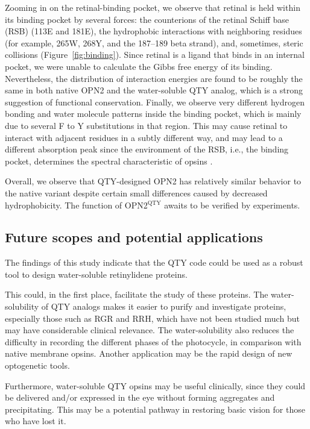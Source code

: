 \documentclass[fleqn, 10pt, lineno]{manuscript}
\begin{document}
Zooming in on the retinal-binding pocket, we observe that retinal is held within its binding pocket by several forces: the counterions of the retinal Schiff base (RSB) (113E and 181E), the hydrophobic interactions with neighboring residues (for example, 265W, 268Y, and the 187--189 beta strand), and, sometimes, steric collisions (Figure~\ref{fig:binding}). Since retinal is a ligand that binds in an internal pocket, we were unable to calculate the Gibbs free energy of its binding. Nevertheless, the distribution of interaction energies are found to be roughly the same in both native OPN2 and the water-soluble QTY analog, which is a strong suggestion of functional conservation. Finally, we observe very different hydrogen bonding and water molecule patterns inside the binding pocket, which is mainly due to several F to Y substitutions in that region. This may cause retinal to interact with adjacent residues in a subtly different way, and may lead to a different absorption peak since the environment of the RSB, i.e., the binding pocket, determines the spectral characteristic of opsins \citep{Fenno_2011}. 

Overall, we observe that QTY-designed OPN2 has relatively similar behavior to the native variant despite certain small differences caused by decreased hydrophobicity. The function of OPN2$^{\textrm{QTY}}$ awaits to be verified by experiments. 

\subsection*{Future scopes and potential applications}

The findings of this study indicate that the QTY code could be used as a robust tool to design water-soluble retinylidene proteins. 

This could, in the first place, facilitate the study of these proteins. The water-solubility of QTY analogs makes it easier to purify and investigate proteins, especially those such as RGR and RRH, which have not been studied much but may have considerable clinical relevance. The water-solubility also reduces the difficulty in recording the different phases of the photocycle, in comparison with native membrane opsins. Another application may be the rapid design of new optogenetic tools. 

Furthermore, water-soluble QTY opsins may be useful clinically, since they could be delivered and/or expressed in the eye without forming aggregates and precipitating. This may be a potential pathway in restoring basic vision for those who have lost it. 
\end{document}
